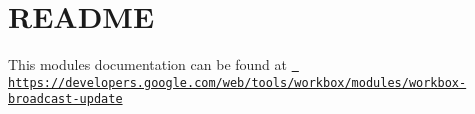 \chapter{README}
\hypertarget{md_node__modules_2workbox-broadcast-update_2README}{}\label{md_node__modules_2workbox-broadcast-update_2README}
This module\textquotesingle{}s documentation can be found at \href{https://developers.google.com/web/tools/workbox/modules/workbox-broadcast-update}{\texttt{ https\+://developers.\+google.\+com/web/tools/workbox/modules/workbox-\/broadcast-\/update}} 